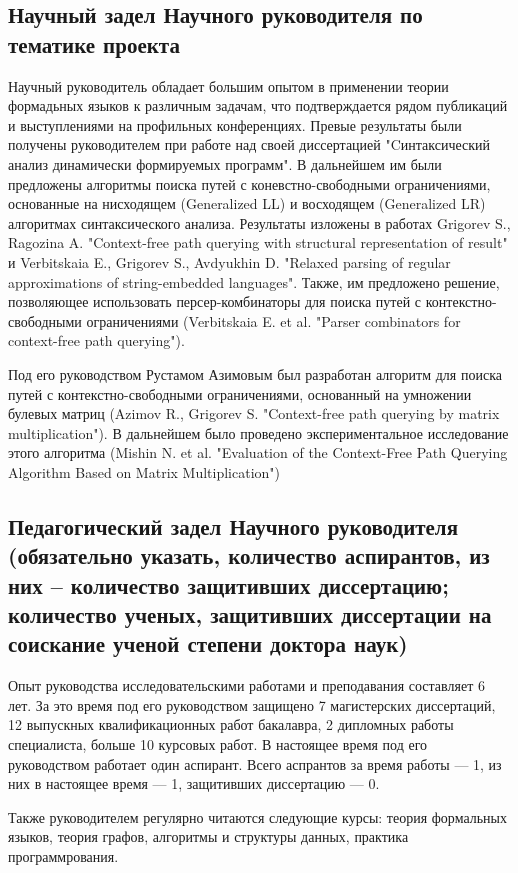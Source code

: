 \documentclass[12pt]{article}  %
\theoremstyle{remark}
\begin{document}
\subsection{Научный задел Научного руководителя по тематике проекта}
Научный руководитель обладает большим опытом в применении теории формадьных языков к различным задачам, что подтверждается рядом публикаций и выступлениями на профильных конференциях.
Превые результаты были получены руководителем при работе над своей диссертацией "Cинтаксический анализ динамически формируемых программ". В дальнейшем им были предложены алгоритмы поиска путей с коневстно-свободными ограничениями, основанные на нисходящем (Generalized LL) и восходящем (Generalized LR) алгоритмах синтаксического анализа. Результаты изложены в работах Grigorev S., Ragozina A. "Context-free path querying with structural representation of result" и Verbitskaia E., Grigorev S., Avdyukhin D. "Relaxed parsing of regular approximations of string-embedded languages". Также, им предложено решение, позволяющее использовать персер-комбинаторы для поиска путей с контекстно-свободными ограничениями (Verbitskaia E. et al. "Parser combinators for context-free path querying").

Под его руководством Рустамом Азимовым был разработан алгоритм для поиска путей с контекстно-свободными ограничениями, основанный на умножении булевых матриц (Azimov R., Grigorev S. "Context-free path querying by matrix multiplication"). В дальнейшем было проведено экспериментальное исследование этого алгоритма (Mishin N. et al. "Evaluation of the Context-Free Path Querying Algorithm Based on Matrix Multiplication")

\subsection{Педагогический задел Научного руководителя (обязательно указать, количество аспирантов, из них – количество защитивших диссертацию; количество ученых, защитивших диссертации на соискание ученой степени доктора наук)}
Опыт руководства исследовательскими работами и преподавания составляет 6 лет.
За это время под его руководством защищено 7 магистерских диссертаций, 12 выпускных квалификационных работ бакалавра, 2 дипломных работы специалиста, больше 10 курсовых работ. В настоящее время под его руководством работает один аспирант. Всего аспрантов за время работы --- 1, из них в настоящее время --- 1, защитивших диссертацию --- 0.

Также руководителем регулярно читаются следующие курсы: теория формальных языков, теория графов, алгоритмы и структуры данных, практика программрования.
\end{document}
